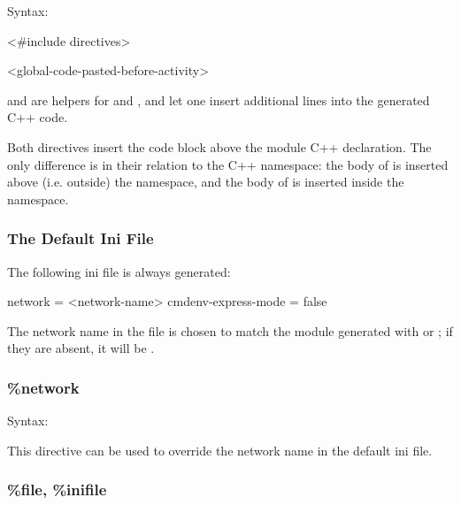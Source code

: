 Syntax:

\begin{filelisting}
<#include directives>
\end{filelisting}

\begin{filelisting}
<global-code-pasted-before-activity>
\end{filelisting}

 and  are helpers for 
and , and let one insert additional lines into the
generated C++ code.

Both directives insert the code block above the module C++ declaration. The only
difference is in their relation to the C++ namespace: the body of 
is inserted above (i.e. outside) the namespace, and the body of 
is inserted inside the namespace.


\subsubsection{The Default Ini File}
\label{sec:testing:opptest:default-ini-file}

The following ini file is always generated:

\begin{inifile}
[General]
network = <network-name>
cmdenv-express-mode = false
\end{inifile}

The network name in the file is chosen to match the module
generated with  or ; if they
are absent, it will be .

\subsubsection{\%network}
\label{sec:testing:opptest:network}

Syntax:

\begin{filelisting}
\end{filelisting}

This directive can be used to override the network name in the default ini file.


\subsubsection{\%file, \%inifile}
\label{sec:testing:opptest:file-and-inifile}

